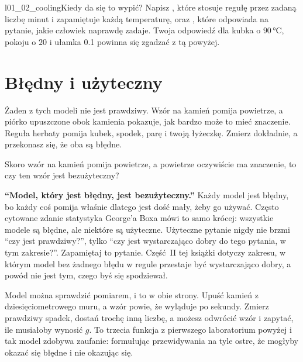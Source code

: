 
\begin{lab}{l01_02_cooling}{Kiedy da się to wypić?}
Napisz , które stosuje regułę przez zadaną liczbę minut i
zapamiętuje każdą temperaturę, oraz , które odpowiada na
pytanie, jakie człowiek naprawdę zadaje. Twoja odpowiedź dla kubka o
$90$\,°C, pokoju o $20$ i ułamka \num{0.1} powinna się zgadzać z tą powyżej.
\end{lab}

\section{Błędny i użyteczny}
\label{sec:ch01-wrong}

\noindent
Żaden z tych modeli nie jest prawdziwy. Wzór na kamień pomija powietrze, a
piórko upuszczone obok kamienia pokazuje, jak bardzo może to mieć znaczenie.
Reguła herbaty pomija kubek, spodek, parę i twoją łyżeczkę. Zmierz dokładnie,
a przekonasz się, że oba są błędne.

\begin{think}
Skoro wzór na kamień pomija powietrze, a powietrze oczywiście ma znaczenie,
to czy ten wzór jest bezużyteczny?
\end{think}

\begin{trapbox}
\textbf{\enquote{Model, który jest błędny, jest bezużyteczny.}} Każdy model
jest błędny, bo każdy coś pomija \dash{} właśnie dlatego jest dość mały, żeby
go używać. Często cytowane zdanie statystyka George'a Boxa mówi to samo
krócej: wszystkie modele są błędne, ale niektóre są użyteczne. Użyteczne
pytanie nigdy nie brzmi \enquote{czy jest prawdziwy?}, tylko \enquote{czy
jest wystarczająco dobry do tego pytania, w tym zakresie?}. Zapamiętaj to
pytanie. Część~II tej książki dotyczy zakresu, w którym model bez żadnego
błędu w regule przestaje być wystarczająco dobry, a powód nie jest tym,
czego byś się spodziewał.
\end{trapbox}

\noindent
Model można sprawdzić pomiarem, i to w obie strony. Upuść kamień z
dziesięciometrowego muru, a wzór powie, że wyląduje po
 sekundy. Zmierz prawdziwy spadek, dostań trochę
inną liczbę, a możesz odwrócić wzór i zapytać, ile musiałoby wynosić $g$. To
trzecia funkcja z pierwszego laboratorium powyżej i tak model zdobywa
zaufanie: formułując przewidywania na tyle ostre, że mogłyby okazać się
błędne \dash{} i nie okazując się.

